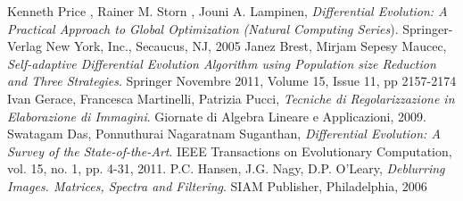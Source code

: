 \backmatter
\begin{thebibliography}{}
Kenneth Price , Rainer M. Storn , Jouni A. Lampinen, \textit{Differential Evolution: A Practical Approach to Global Optimization (Natural Computing Series}). Springer-Verlag New York, Inc., Secaucus, NJ, 2005
Janez Brest, Mirjam Sepesy Maucec, \textit{Self-adaptive Differential Evolution Algorithm using Population size Reduction and Three Strategies}. Springer Novembre 2011, Volume 15, Issue 11, pp 2157-2174
Ivan Gerace, Francesca Martinelli, Patrizia Pucci, \textit{Tecniche di Regolarizzazione in Elaborazione di Immagini}. Giornate di Algebra Lineare e Applicazioni, 2009.
 Swatagam Das, Ponnuthurai Nagaratnam Suganthan, \textit{Differential Evolution: A Survey of the State-of-the-Art}.  IEEE Transactions on Evolutionary Computation, vol. 15, no. 1, pp. 4-31, 2011. 
 P.C. Hansen, J.G. Nagy, D.P. O’Leary, \textit{Deblurring Images. Matrices,
Spectra and Filtering}. SIAM Publisher, Philadelphia, 2006
\end{thebibliography}